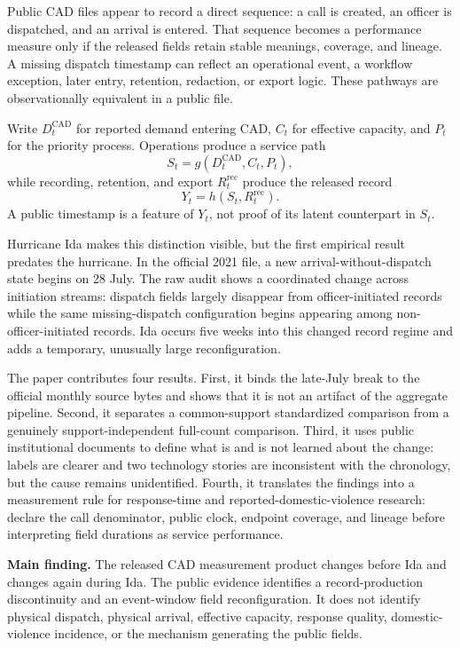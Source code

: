 \documentclass[11pt]{article}
\begin{document}
Public CAD files appear to record a direct sequence: a call is created, an officer is dispatched, and an arrival is entered. That sequence becomes a performance measure only if the released fields retain stable meanings, coverage, and lineage. A missing dispatch timestamp can reflect an operational event, a workflow exception, later entry, retention, redaction, or export logic. These pathways are observationally equivalent in a public file.

Write $D_t^{\mathrm{CAD}}$ for reported demand entering CAD, $C_t$ for effective capacity, and $P_t$ for the priority process. Operations produce a service path
\begin{equation}
S_t=g(D_t^{\mathrm{CAD}},C_t,P_t),
\end{equation}
while recording, retention, and export $R_t^{\mathrm{rec}}$ produce the released record
\begin{equation}
Y_t=h(S_t,R_t^{\mathrm{rec}}).
\end{equation}
A public timestamp is a feature of $Y_t$, not proof of its latent counterpart in $S_t$.

Hurricane Ida makes this distinction visible, but the first empirical result predates the hurricane. In the official 2021 file, a new arrival-without-dispatch state begins on 28 July. The raw audit shows a coordinated change across initiation streams: dispatch fields largely disappear from officer-initiated records while the same missing-dispatch configuration begins appearing among non-officer-initiated records. Ida occurs five weeks into this changed record regime and adds a temporary, unusually large reconfiguration.

The paper contributes four results. First, it binds the late-July break to the official monthly source bytes and shows that it is not an artifact of the aggregate pipeline. Second, it separates a common-support standardized comparison from a genuinely support-independent full-count comparison. Third, it uses public institutional documents to define what is and is not learned about the change: labels are clearer and two technology stories are inconsistent with the chronology, but the cause remains unidentified. Fourth, it translates the findings into a measurement rule for response-time and reported-domestic-violence research: declare the call denominator, public clock, endpoint coverage, and lineage before interpreting field durations as service performance.

\begin{resultbox}
\textbf{Main finding.} The released CAD measurement product changes before Ida and changes again during Ida. The public evidence identifies a record-production discontinuity and an event-window field reconfiguration. It does not identify physical dispatch, physical arrival, effective capacity, response quality, domestic-violence incidence, or the mechanism generating the public fields.
\end{resultbox}
\end{document}
